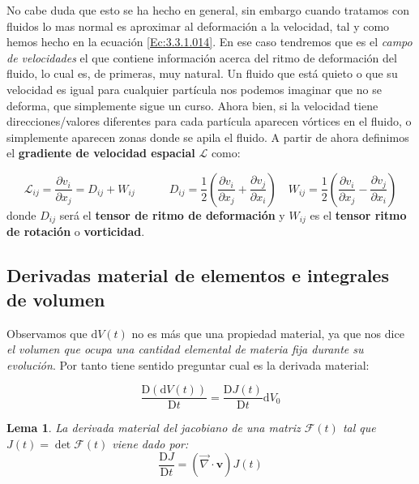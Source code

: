 \documentclass[12pt,a4paper]{article}
\numberwithin{equation}{section}
\numberwithin{figure}{section}
\newcommand{\parentesis}[1]{\left( #1  \right)}
\newcommand{\parciales}[2]{\frac{\partial #1}{\partial #2}}
\newcommand{\D}{\mathrm{d}}
\newcommand{\Dd}{\mathrm{D}}
\newcommand{\tquad}{\quad \quad \quad}
\newcommand{\vn}{\mathbf{v}}
\newtheorem{lemma}{Lema}[section]
\begin{document}
No cabe duda que esto se ha hecho en general, sin embargo cuando tratamos con fluidos lo mas normal es aproximar al deformación a la velocidad, tal y como hemos hecho en la ecuación   \ref{Ec:3.3.1.014}. En ese caso tendremos que es el \textit{campo de velocidades} el que contiene información acerca del ritmo de deformación del fluido, lo cual es, de primeras, muy natural. Un fluido que está quieto o que su velocidad es igual para cualquier partícula nos podemos imaginar que no se deforma, que simplemente sigue un curso. Ahora bien, si la velocidad tiene direcciones/valores diferentes para cada partícula aparecen vórtices en el fluido, o simplemente aparecen zonas donde se apila el fluido. A partir de ahora definimos el \textbf{gradiente de velocidad espacial} $\mathcal{L}$ como:

\begin{equation}
\mathcal{L}_{ij} = \parciales{v_i}{x_j} = D_{ij} + W_{ij} \tquad D_{ij} = \dfrac{1}{2} \parentesis{\parciales{v_i}{x_j} + \parciales{v_j}{x_i}}  \quad W_{ij} = \dfrac{1}{2}  \parentesis{\parciales{v_i}{x_j} - \parciales{v_j}{x_i}}
\end{equation}
donde $D_{ij}$ será el \textbf{tensor de ritmo de deformación} y $W_{ij}$ es el \textbf{tensor ritmo de rotación} o \textbf{vorticidad}. 

\subsection{Derivadas material de elementos e integrales de volumen}

Observamos que $\D V(t)$ no es más que una propiedad material, ya que nos dice \textit{el volumen que ocupa una cantidad elemental de materia fija durante su evolución}. Por tanto tiene sentido preguntar cual es la derivada material:

\begin{equation}
\dfrac{\Dd (\D V(t))}{\Dd t} = \dfrac{\Dd J(t)}{\Dd t} \D V_0
\end{equation} 




\begin{lemma}
La derivada material del jacobiano de una matriz $\mathcal{F}(t)$ tal que  $J(t) = \det \mathcal{F}(t)$ viene dado por:
\begin{equation}
\dfrac{\Dd J}{\Dd t} = (\vec{\nabla} \cdot \vn) J(t)
\end{equation}
\end{lemma}
\end{document}
